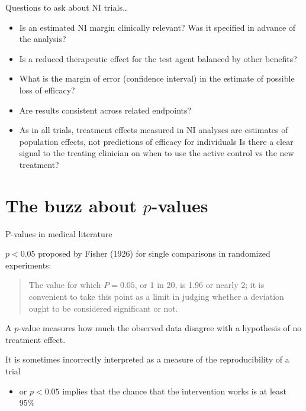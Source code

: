 \documentclass[ignorenonframetext,]{beamer}
\providecommand{\tightlist}{%
  \setlength{\itemsep}{0pt}\setlength{\parskip}{0pt}}
\begin{document}
\begin{frame}{%
\protect\hypertarget{questions-to-ask-about-ni-trials-1}{%
Questions to ask about NI trials\ldots{}}}

\begin{itemize}
\item
  Is an estimated NI margin clinically relevant? Was it specified in
  advance of the analysis?
\item
  Is a reduced therapeutic effect for the test agent balanced by other
  benefits?
\item
  What is the margin of error (confidence interval) in the estimate of
  possible loss of efficacy?
\item
  Are results consistent across related endpoints?
\item
  As in all trials, treatment effects measured in NI analyses are
  estimates of population effects, not predictions of efficacy for
  individuals Is there a clear signal to the treating clinician on when
  to use the active control vs the new treatment?
\end{itemize}

\end{frame}

\hypertarget{the-buzz-about-p-values}{%
\section{\texorpdfstring{The buzz about
\(p\)-values}{The buzz about p-values}}\label{the-buzz-about-p-values}}

\begin{frame}{%
\protect\hypertarget{p-values-in-medical-literature}{%
P-values in medical literature}}

\(p < 0.05\) proposed by Fisher (1926) for single comparisons in
randomized experiments:

\begin{quote}

The value for which $P = 0.05$, or 1 in 20, is 1.96 or nearly 2; it is convenient to take this point as a limit in judging whether a deviation ought to be considered significant or not. 

\end{quote}

A \(p\)-value measures how much the observed data disagree with a
hypothesis of no treatment effect.

It is sometimes incorrectly interpreted as a measure of the
reproducibility of a trial

\begin{itemize}
\tightlist
\item
  or \(p < 0.05\) implies that the chance that the intervention works is
  at least 95\%
\end{itemize}

\end{frame}
\end{document}
